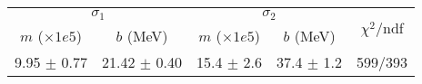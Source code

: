 \begin{tabular}{cc|cc||c}
\multicolumn{2}{c|}{$\sigma_1$} & \multicolumn{2}{|c}{$\sigma_2$}  & \multirow{2}{*}{$\chi^2/$ndf}\\
$m$ ($\times1e5$) & $b$ (MeV) & $m$ ($\times1e5$) & $b$ (MeV)  & \\
\hline
9.95 $\pm$ 0.77 & 21.42 $\pm$ 0.40 & 15.4 $\pm$ 2.6 & 37.4 $\pm$ 1.2 & 599/393\\
\end{tabular}
